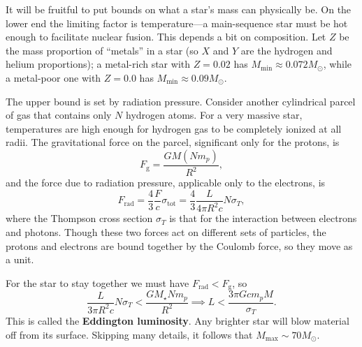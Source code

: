 \documentclass[../a062main.tex]{subfiles}
\begin{document}
It will be fruitful to put bounds on what a star's mass can physically be.
On the lower end the limiting factor is temperature---a main-sequence star must be hot enough to facilitate nuclear fusion.
This depends a bit on composition.
Let $Z$ be the mass proportion of ``metals'' in a star (so $X$ and $Y$ are the hydrogen and helium proportions); a metal-rich star with $Z = 0.02$ has $M_\textrm{min} \approx 0.072M_\odot$, while a metal-poor one with $Z = 0.0$ has $M_\textrm{min} \approx 0.09M_\odot$.

The upper bound is set by radiation pressure.
Consider another cylindrical parcel of gas that contains only $N$ hydrogen atoms.
For a very massive star, temperatures are high enough for hydrogen gas to be completely ionized at all radii.
The gravitational force on the parcel, significant only for the protons, is
\[ F_\textrm{g} = \frac{GM(Nm_p)}{R^2}, \]
and the force due to radiation pressure, applicable only to the electrons, is
\[ F_\textrm{rad} = \frac{4}{3} \frac{F}{c} \sigma_\textrm{tot} = \frac{4}{3} \frac{L}{4\pi R^2 c} N \sigma_T, \]
where the Thompson cross section $\sigma_T$ is that for the interaction between electrons and photons.
Though these two forces act on different sets of particles, the protons and electrons are bound together by the Coulomb force, so they move as a unit.

For the star to stay together we must have $F_\textrm{rad} < F_\textrm{g}$, so
\[ \frac{L}{3 \pi R^2 c} N\sigma_T < \frac{GM_\star N m_p}{R^2} \implies L < \frac{3\pi G c m_pM}{\sigma_T}. \]
This is called the \textbf{Eddington luminosity}.
Any brighter star will blow material off from its surface.
Skipping many details, it follows that $M_\textrm{max} \sim 70M_\odot$.
\end{document}
